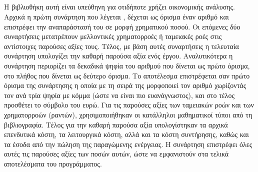 \documentclass[12pt]{report}
\begin{document}
\subsection{{}}
Η βιβλιοθήκη αυτή είναι υπεύθηνη για οτιδήποτε χρήζει οικονομικής ανάλυσης. Αρχικά η πρώτη συνάρτηση που λέγεται {\textbf{{}}}, δέχεται ως όρισμα έναν αριθμό και επιστρέφει την αναπαράστασή του σε μορφή χρηματικού 
ποσού. Οι επόμενες δύο συναρτήσεις μετατρέπουν μελλοντικές χρηματορροές ή ταμειακές ροές στις αντίστοιχες παρούσες αξίες τους. Τέλος, με βάση αυτές συναρτήσεις η τελευταία συνάρτηση υπολογίζει την καθαρή παρούσα αξία ενός έργου.
Αναλυτικότερα η συνάρτηση {} περιορίζει τα δεκαδικά ψηφία του αριθμού που δίνεται ως πρώτο όρισμα, στο πλήθος που δίνεται ως δεύτερο όρισμα. Το αποτέλεσμα επιστρέφεται σαν πρώτο όρισμα της συνάρτησης
{} η οποία με τη σειρά της μορφοποιεί τον αριθμό χωρίζοντάς τον ανά τρία ψηφία με κόμμα (ώστε να είναι πιο ευανάγνωστος), και στο τέλος προσθέτει το σύμβολο του ευρώ. Για τις παρούσες αξίες των ταμειακών ροών και
των χρηματορροών (ραντών), χρησιμοποιήθηκαν οι κατάλληλοι μαθηματικοί τύποι από τη βιβλιογραφία. Τέλος για την καθαρή παρούσα αξία υπολογίστηκαν τα αρχικά επενδυτικά κόστη, τα λειτουργικά κόστη, αλλά και τα κόστη συντήρησης, καθώς
και τα έσοδα από την πώληση της παραγώμενης ενέργειας. Η συνάρτηση επιστρέφει όλες αυτές τις παρούσες αξίες των ποσών αυτών, ώστε να εμφανιστούν στα τελικά αποτελέσματα του προγράμματος.

{}
\end{document}
